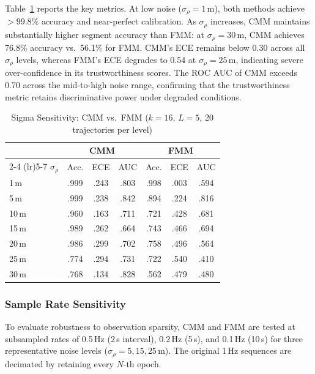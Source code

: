 \documentclass[letterpaper,journal]{IEEEtran}
\begin{document}
Table~\ref{tab:sigma_sweep} reports the key metrics. At low noise ($\sigma_{\rho}=1$\,m), both methods achieve $>99.8\%$ accuracy and near-perfect calibration. As $\sigma_{\rho}$ increases, CMM maintains substantially higher segment accuracy than FMM: at $\sigma_{\rho}=30$\,m, CMM achieves 76.8\% accuracy vs.\ 56.1\% for FMM. CMM's ECE remains below 0.30 across all $\sigma_{\rho}$ levels, whereas FMM's ECE degrades to 0.54 at $\sigma_{\rho}=25$\,m, indicating severe over-confidence in its trustworthiness scores. The ROC AUC of CMM exceeds 0.70 across the mid-to-high noise range, confirming that the trustworthiness metric retains discriminative power under degraded conditions.

\begin{table}[htbp]
\centering
\caption{Sigma Sensitivity: CMM vs.\ FMM ($k=16$, $L=5$, 20 trajectories per level)}
\label{tab:sigma_sweep}
\footnotesize
\setlength{\tabcolsep}{3pt}
\begin{tabular}{lcccccc}
\toprule
& \multicolumn{3}{c}{CMM} & \multicolumn{3}{c}{FMM} \\
\cmidrule(lr){2-4} \cmidrule(lr){5-7}
$\sigma_{\rho}$ & Acc. & ECE & AUC & Acc. & ECE & AUC \\
\midrule
1\,m  & .999 & .243 & .803 & .998 & .003 & .594 \\
5\,m  & .999 & .238 & .842 & .894 & .224 & .816 \\
10\,m & .960 & .163 & .711 & .721 & .428 & .681 \\
15\,m & .989 & .262 & .664 & .743 & .466 & .694 \\
20\,m & .986 & .299 & .702 & .758 & .496 & .564 \\
25\,m & .774 & .294 & .731 & .722 & .540 & .410 \\
30\,m & .768 & .134 & .828 & .562 & .479 & .480 \\
\bottomrule
\end{tabular}
\end{table}

\subsubsection{Sample Rate Sensitivity}

To evaluate robustness to observation sparsity, CMM and FMM are tested at subsampled rates of 0.5\,Hz (2\,s interval), 0.2\,Hz (5\,s), and 0.1\,Hz (10\,s) for three representative noise levels ($\sigma_{\rho}=5,15,25$\,m). The original 1\,Hz sequences are decimated by retaining every $N$-th epoch.
\end{document}
